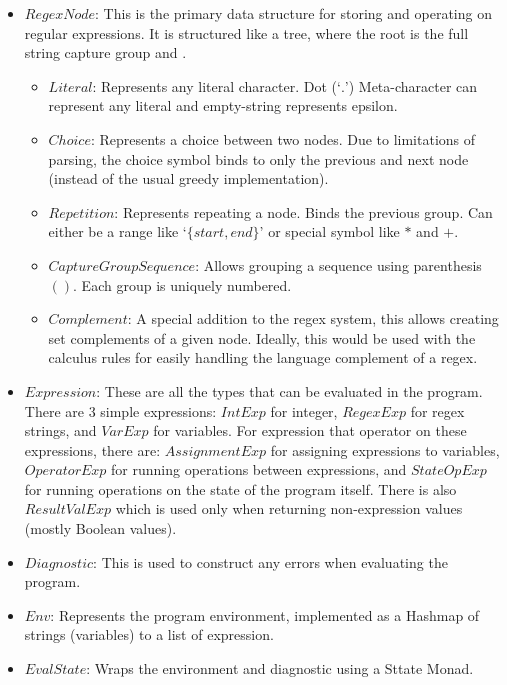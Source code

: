 \documentclass[letterpaper, 11pt]{article}
\begin{document}
\begin{itemize}[itemsep=-0.5em]
    \item $RegexNode$: This is the primary data structure for storing and operating on regular expressions. It is structured like a tree, where the root is the full string capture group and .
    \begin{itemize}[itemsep=-0.3em]
        \item $Literal$: Represents any literal character. Dot (`$.$') Meta-character can represent any literal and empty-string represents epsilon.
        \item $Choice$: Represents a choice between two nodes. Due to limitations of parsing, the choice symbol binds to only the previous and next node (instead of the usual greedy implementation).
        \item $Repetition$: Represents repeating a node. Binds the previous group. Can either be a range like `$\{start, end\}$' or special symbol like $*$ and $+$.
        \item $Capture Group Sequence$: Allows grouping a sequence using parenthesis $()$. Each group is uniquely numbered.
        \item $Complement$: A special addition to the regex system, this allows creating set complements of a given node. Ideally, this would be used with the calculus rules for easily handling the language complement of a regex.
    \end{itemize}
    \item $Expression$: These are all the types that can be evaluated in the program. There are 3 simple expressions: $IntExp$ for integer, $RegexExp$ for regex strings, and $VarExp$ for variables. For expression that operator on these expressions, there are: $AssignmentExp$ for assigning expressions to variables, $OperatorExp$ for running operations between expressions, and $StateOpExp$ for running operations on the state of the program itself. There is also $ResultValExp$ which is used only when returning non-expression values (mostly Boolean values).
    \item $Diagnostic$: This is used to construct any errors when evaluating the program.
    \item $Env$: Represents the program environment, implemented as a Hashmap of strings (variables) to a list of expression.
    \item $EvalState$: Wraps the environment and diagnostic using a Sttate Monad. 
\end{itemize}
\end{document}
